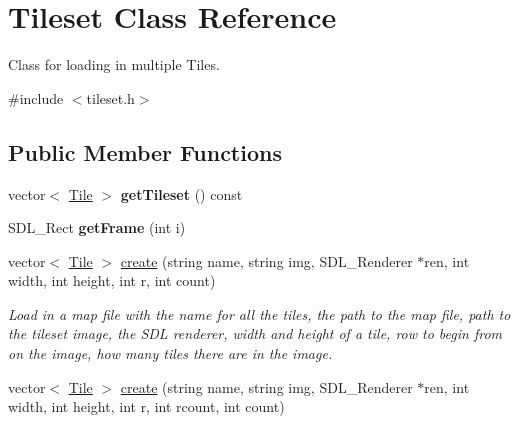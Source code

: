 \hypertarget{classTileset}{}\section{Tileset Class Reference}
\label{classTileset}


Class for loading in multiple Tiles.  




{\ttfamily \#include $<$tileset.\+h$>$}

\subsection*{Public Member Functions}
\begin{DoxyCompactItemize}
\item 
vector$<$ \hyperlink{classTile}{Tile} $>$ {\bfseries get\+Tileset} () const \hypertarget{classTileset_ae5f7859d69952b223bdb322796bcc9f2}{}\label{classTileset_ae5f7859d69952b223bdb322796bcc9f2}

\item 
S\+D\+L\+\_\+\+Rect {\bfseries get\+Frame} (int i)\hypertarget{classTileset_aefa962edb9c573aca7327387ba6be0b1}{}\label{classTileset_aefa962edb9c573aca7327387ba6be0b1}

\item 
vector$<$ \hyperlink{classTile}{Tile} $>$ \hyperlink{classTileset_ad11cd044d9a2907003fee3baacba86e7}{create} (string name, string img, S\+D\+L\+\_\+\+Renderer $\ast$ren, int width, int height, int r, int count)\hypertarget{classTileset_ad11cd044d9a2907003fee3baacba86e7}{}\label{classTileset_ad11cd044d9a2907003fee3baacba86e7}

\begin{DoxyCompactList}\small\item\em Load in a map file with the name for all the tiles, the path to the map file, path to the tileset image, the S\+DL renderer, width and height of a tile, row to begin from on the image, how many tiles there are in the image. \end{DoxyCompactList}\item 
vector$<$ \hyperlink{classTile}{Tile} $>$ \hyperlink{classTileset_a1435c7ce70c5aa6da6388762971917aa}{create} (string name, string img, S\+D\+L\+\_\+\+Renderer $\ast$ren, int width, int height, int r, int rcount, int count)\hypertarget{classTileset_a1435c7ce70c5aa6da6388762971917aa}{}\label{classTileset_a1435c7ce70c5aa6da6388762971917aa}


\end{DoxyCompactItemize}
